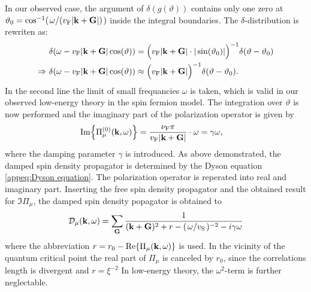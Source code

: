 In our observed case, the argument of $\delta(g(\vartheta))$ contains only one zero at \linebreak $\vartheta_{0} = \cos[-1](\flatfrac{\omega}{(v_{\mt{F}} |\vb{k} + \vb{G}|)})$ inside the integral boundaries.
The $\delta$-distribution is rewriten as:
%
\begin{align}
	&\delta(\omega - v_{\mathrm{F}} |\vb{k} + \vb{G}| \cos(\vartheta)) = \Big(v_{\mathrm{F}} |\vb{k} + \vb{G}| \cdot |\sin(\vartheta_{0})|\Big)^{-1} \delta(\vartheta - \vartheta_{0})
	\notag \\
	\Rightarrow\ &\delta(\omega - v_{\mathrm{F}} |\vb{k} + \vb{G}| \cos(\vartheta)) \approx \Big(v_{\mathrm{F}} |\vb{k} + \vb{G}|\Big)^{-1} \delta(\vartheta - \vartheta_{0}).
\end{align}
%
In the second line the limit of small frequancies $\omega$ is taken, which is valid in our observed low-energy theory in the spin fermion model.
The integration over $\vartheta$ is now performed and the imaginary part of the polarization operator is given by
%
\begin{align}
	\Im{\Pi_{\mu}^{(0)}(\vb{k}, \omega)} &= \frac{\nu_{\mathrm{F}} \pi}{v_{\mathrm{F}} |\vb{k} + \vb{G}|} \cdot \omega = \gamma \omega,	 
\end{align}
%
where the damping parameter $\gamma$ is introduced.
As above demonstrated, the damped spin density propagator is determined by the Dyson equation \eqref{appeq:Dyson equation}.
The polarization operator is reperated into real and imaginary part.
Inserting the free spin density propagator and the obtained result for $\Im{\Pi_{\mu}}$, the damped spin density popagator is obtained to
%
\begin{align}
	\mathcal{D}_{\mu}(\vb{k}, \omega) = \sum\limits_{\vb{G}} \frac{1}{(\vb{k}+\vb{G})^{2} + r - (\flatfrac{\omega}{v_{\mt{S}}})^{-2} - i \gamma \omega}
	\label{appeq:damped spin density propagator with real omega}
\end{align}
%
where the abbreviation $r = r_{0} - \Re{\Pi_{\mu}(\vb{k}, \omega)}$ is used.
In the vicinity of the quantum critical point the real part of $\Pi_{\mu}$ is canceled by $r_{0}$, since the correlations length is divergent and $r=\xi^{-2}$
In low-energy theory, the $\omega^{2}$-term is further neglectable.
%
%
